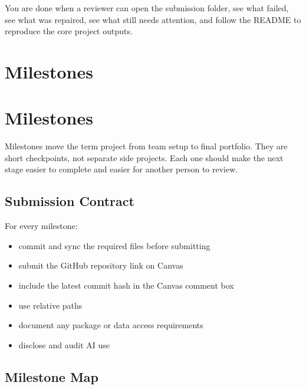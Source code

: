 \documentclass[
  letterpaper,
  DIV=11,
  numbers=noendperiod,
  oneside]{scrreprt}
\providecommand{\tightlist}{%
  \setlength{\itemsep}{0pt}\setlength{\parskip}{0pt}}
\begin{document}
You are done when a reviewer can open the submission folder, see what
failed, see what was repaired, see what still needs attention, and
follow the README to reproduce the core project outputs.

\chapter{Milestones}\label{milestones}

\chapter{Milestones}\label{milestones-1}

Milestones move the term project from team setup to final portfolio.
They are short checkpoints, not separate side projects. Each one should
make the next stage easier to complete and easier for another person to
review.

\section{Submission Contract}\label{submission-contract}

For every milestone:

\begin{itemize}
\tightlist
\item
  commit and sync the required files before submitting
\item
  submit the GitHub repository link on Canvas
\item
  include the latest commit hash in the Canvas comment box
\item
  use relative paths
\item
  document any package or data access requirements
\item
  disclose and audit AI use
\end{itemize}

\section{Milestone Map}\label{milestone-map}
\end{document}
